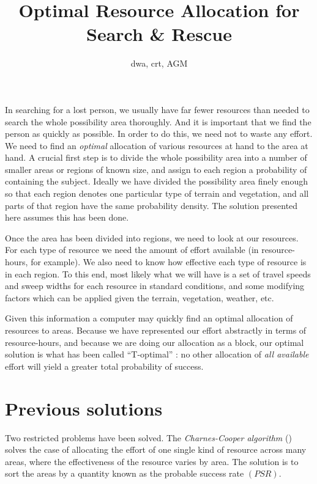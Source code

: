 \documentclass[10pt]{article}
\title{Optimal Resource Allocation for Search \& Rescue}
\author{dwa, crt, AGM}
\begin{document}
\maketitle

In searching for a lost person, we usually have far fewer resources
than needed to search the whole possibility area thoroughly. And it is
important that we find the person as quickly as possible. In order to
do this, we need not to waste any effort. We need to find an
\emph{optimal} allocation of various resources at hand to the area at
hand. A crucial first step is to divide the whole possibility area
into a number of smaller areas or regions of known size, and assign to
each region a probability of containing the subject. Ideally we have
divided the possibility area finely enough so that each region denotes
one particular type of terrain and vegetation, and all parts of that
region have the same probability density. The solution presented here
assumes this has been done.

Once the area has been divided into regions, we need to look at our
resources. For each type of resource we need the amount of effort
available (in resource-hours, for example). We also need to know how
effective each type of resource is in each region. To this end, most
likely what we will have is a set of travel speeds and sweep widths
for each resource in standard conditions, and some modifying factors
which can be applied given the terrain, vegetation, weather, etc.

Given this information a computer may quickly find an optimal
allocation of resources to areas. Because we have represented our
effort abstractly in terms of resource-hours, and because we are doing
our allocation as a block, our optimal solution is what has been
called ``T-optimal'' \cite{}: no other allocation of \emph{all
  available} effort will yield a greater total probability of success.


\section{Previous solutions}
\label{sec:Previous-solutions}

Two restricted problems have been solved. The \emph{Charnes-Cooper
  algorithm} (\cite{}) solves the case of
allocating the effort of one single kind of resource across many
areas, where the effectiveness of the resource varies by area. The
solution is to sort the areas by a quantity known as the probable
success rate $(PSR)$.
\end{document}
